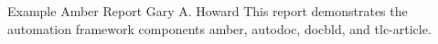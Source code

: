 \documentclass[10pt]{tlc-article}
\begin{document}
  \tlcTitlePageAndTableOfContents
    {Example Amber Report}
    {Gary A. Howard}
    {This report demonstrates the automation framework components amber,
    autodoc, docbld, and tlc-article.}
 
\end{document}
